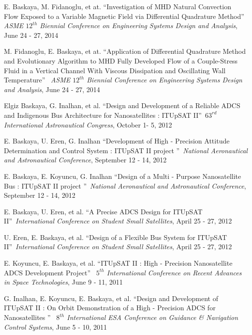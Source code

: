 \documentclass[margin,line]{res}
\begin{document}
\begin{resume}
E. Baskaya, M. Fidanoglu, et at. \textquotedblleft Investigation of MHD Natural Convection Flow Exposed to a Variable Magnetic Field via Differential Quadrature Method\textquotedblright\ \emph{ ASME $12^{th}$ Biennial Conference on Engineering Systems Design and Analysis}, June 24 - 27, 2014 

M. Fidanoglu, E. Baskaya, et at. \textquotedblleft Application of Differential Quadrature Method and Evolutionary Algorithm to MHD Fully Developed Flow of a Couple-Stress Fluid in a Vertical Channel With Viscous Dissipation and Oscillating Wall Temperature\textquotedblright\ \emph{ ASME $12^{th}$ Biennial Conference on Engineering Systems Design and Analysis}, June 24 - 27, 2014 

Elgiz Baskaya, G. Inalhan, et al. \textquotedblleft Design and Development of a Reliable ADCS and Indigenous Bus Architecture for Nanosatellites : ITUpSAT II\textquotedblright\ \emph{$63^{rd}$ International Astronautical Congress}, October 1- 5, 2012

E. Baskaya, U. Eren, G. Inalhan \textquotedblleft Development of High - Precision Attitude Determination and Control  System : ITUpSAT II project \textquotedblright\ \emph{National Aeronautical and Astronautical Conference}, September 12 - 14, 2012

E. Baskaya, E. Koyuncu, G. Inalhan \textquotedblleft Design of a Multi - Purpose Nanosatellite Bus : ITUpSAT II project \textquotedblright\ \emph{National Aeronautical and Astronautical Conference}, September 12 - 14, 2012

E. Baskaya, U. Eren, et al. \textquotedblleft A Precise ADCS Design for ITUpSAT II\textquotedblright\ \emph{International Conference on Student Small Satellites}, April 25 - 27, 2012

U. Eren, E. Baskaya, et al. \textquotedblleft Design of a Flexible Bus System for ITUpSAT II\textquotedblright\ \emph{International Conference on Student Small Satellites}, April 25 - 27, 2012

E. Koyuncu, E. Baskaya, et al. \textquotedblleft ITUpSAT II : High - Precision Nanosatellite ADCS Development Project\textquotedblright\ \emph{ $5^{th}$ International Conference on Recent Advances in Space Technologies}, June 9 - 11, 2011

G. Inalhan, E. Koyuncu, E. Baskaya, et al. \textquotedblleft Design and Development of ITUpSAT II : On Orbit Demonstration of a High - Precision ADCS for Nanosatellites \textquotedblright\ \emph{ $8^{th}$ International ESA Conference on Guidance \& Navigation Control Systems}, June 5 - 10, 2011


\end{resume}
\end{document}
